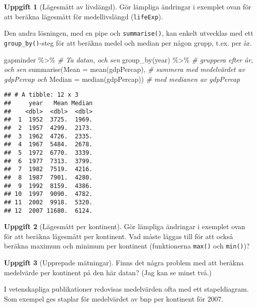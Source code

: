 \documentclass[
]{book}
\newenvironment{Shaded}{\begin{snugshade}}{\end{snugshade}}
\newcommand{\AttributeTok}[1]{\textcolor[rgb]{0.77,0.63,0.00}{#1}}
\newcommand{\CommentTok}[1]{\textcolor[rgb]{0.56,0.35,0.01}{\textit{#1}}}
\newcommand{\FunctionTok}[1]{\textcolor[rgb]{0.00,0.00,0.00}{#1}}
\newcommand{\NormalTok}[1]{#1}
\newcommand{\SpecialCharTok}[1]{\textcolor[rgb]{0.00,0.00,0.00}{#1}}
\theoremstyle{definition}
\theoremstyle{definition}
\theoremstyle{definition}
\newtheorem{exercise}{Uppgift}[chapter]
\theoremstyle{definition}
\theoremstyle{remark}
\begin{document}
\begin{exercise}[Lägesmått av livslängd]
Gör lämpliga ändringar i exemplet ovan för att beräkna lägesmått för medellivslängd (\texttt{lifeExp}).
\end{exercise}

Den andra lösningen, med en pipe och \texttt{summarise()}, kan enkelt utvecklas med ett \texttt{group\_by()}-steg för att beräkna medel och median per någon grupp, t.ex. per år.

\begin{Shaded}
\begin{Highlighting}[]
\NormalTok{gapminder }\SpecialCharTok{\%\textgreater{}\%}                                    \CommentTok{\# Ta datan, och sen}
  \FunctionTok{group\_by}\NormalTok{(year) }\SpecialCharTok{\%\textgreater{}\%}                             \CommentTok{\# gruppera efter år, och sen}
  \FunctionTok{summarise}\NormalTok{(}\AttributeTok{Mean =} \FunctionTok{mean}\NormalTok{(gdpPercap),              }\CommentTok{\# summera med medelvärdet av gdpPercap och}
            \AttributeTok{Median =} \FunctionTok{median}\NormalTok{(gdpPercap))          }\CommentTok{\# med medianen av gdpPercap}
\end{Highlighting}
\end{Shaded}

\begin{verbatim}
## # A tibble: 12 x 3
##     year   Mean Median
##    <dbl>  <dbl>  <dbl>
##  1  1952  3725.  1969.
##  2  1957  4299.  2173.
##  3  1962  4726.  2335.
##  4  1967  5484.  2678.
##  5  1972  6770.  3339.
##  6  1977  7313.  3799.
##  7  1982  7519.  4216.
##  8  1987  7901.  4280.
##  9  1992  8159.  4386.
## 10  1997  9090.  4782.
## 11  2002  9918.  5320.
## 12  2007 11680.  6124.
\end{verbatim}

\begin{exercise}[Lägesmått per kontinent]
Gör lämpliga ändringar i exemplet ovan för att beräkna lägesmått per kontinent. Vad måste läggas till för att också beräkna maximum och minimum per kontinent (funktionerna \texttt{max()} och \texttt{min()})?
\end{exercise}

\begin{exercise}[Upprepade mätningar]
Finns det några problem med att beräkna medelvärde per kontinent på den här datan? (Jag kan se minst två.)
\end{exercise}

I vetenskapliga publikationer redovisas medelvärden ofta med ett stapeldiagram. Som exempel ges staplar för medelvärdet av bnp per kontinent för 2007.
\end{document}
